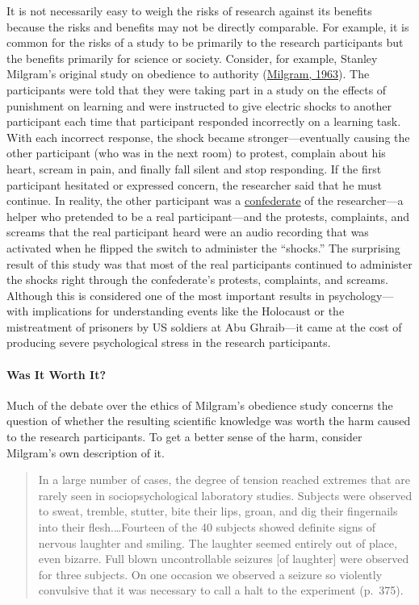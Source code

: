 \documentclass[
]{krantz}
\begin{document}
It is not necessarily easy to weigh the risks of research against its benefits because the risks and benefits may not be directly comparable. For example, it is common for the risks of a study to be primarily to the research participants but the benefits primarily for science or society. Consider, for example, Stanley Milgram's original study on obedience to authority (\protect\hyperlink{ref-milgram1963behavioral}{Milgram, 1963}). The participants were told that they were taking part in a study on the effects of punishment on learning and were instructed to give electric shocks to another participant each time that participant responded incorrectly on a learning task. With each incorrect response, the shock became stronger---eventually causing the other participant (who was in the next room) to protest, complain about his heart, scream in pain, and finally fall silent and stop responding. If the first participant hesitated or expressed concern, the researcher said that he must continue. In reality, the other participant was a \protect\hyperlink{confederate}{confederate} of the researcher---a helper who pretended to be a real participant---and the protests, complaints, and screams that the real participant heard were an audio recording that was activated when he flipped the switch to administer the ``shocks.'' The surprising result of this study was that most of the real participants continued to administer the shocks right through the confederate's protests, complaints, and screams. Although this is considered one of the most important results in psychology---with implications for understanding events like the Holocaust or the mistreatment of prisoners by US soldiers at Abu Ghraib---it came at the cost of producing severe psychological stress in the research participants.

\hypertarget{was-it-worth-it}{%
\paragraph*{Was It Worth It?}\label{was-it-worth-it}}

Much of the debate over the ethics of Milgram's obedience study concerns the question of whether the resulting scientific knowledge was worth the harm caused to the research participants. To get a better sense of the harm, consider Milgram's own description of it.

\begin{quote}
In a large number of cases, the degree of tension reached extremes that are rarely seen in sociopsychological laboratory studies. Subjects were observed to sweat, tremble, stutter, bite their lips, groan, and dig their fingernails into their flesh.\ldots Fourteen of the 40 subjects showed definite signs of nervous laughter and smiling. The laughter seemed entirely out of place, even bizarre. Full blown uncontrollable seizures {[}of laughter{]} were observed for three subjects. On one occasion we observed a seizure so violently convulsive that it was necessary to call a halt to the experiment (p.~375).
\end{quote}
\end{document}
